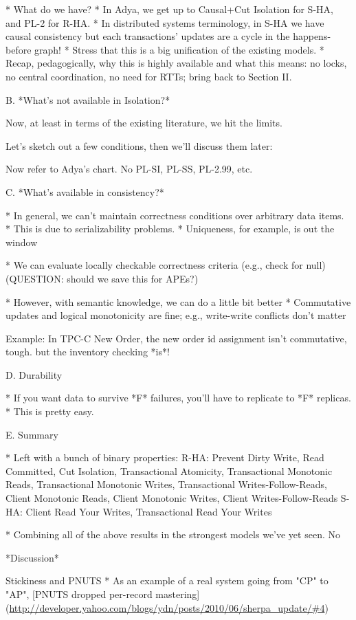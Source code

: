 * What do we have?
	* In Adya, we get up to Causal+Cut Isolation for S-HA, and PL-2 for R-HA.
	* In distributed systems terminology, in S-HA we have causal consistency but each transactions' updates are a cycle in the happens-before graph!
		* Stress that this is a big unification of the existing models.
	* Recap, pedagogically, why this is highly available and what this means: no locks, no central coordination, no need for RTTs; bring back to Section II.

B. *What's not available in Isolation?*

Now, at least in terms of the existing literature, we hit the limits.

Let's sketch out a few conditions, then we'll discuss them later:

Now refer to Adya's chart. No PL-SI, PL-SS, PL-2.99, etc.

C. *What's available in consistency?*

* In general, we can't maintain correctness conditions over arbitrary data items.
	* This is due to serializability problems.
	* Uniqueness, for example, is out the window

* We can evaluate locally checkable correctness criteria (e.g., check for null)
	(QUESTION: should we save this for APEs?)

* However, with semantic knowledge, we can do a little bit better
	* Commutative updates and logical monotonicity are fine; e.g., write-write conflicts don't matter
	
Example: In TPC-C New Order, the new order id assignment isn't commutative, tough. but the inventory checking *is*!

D. Durability

* If you want data to survive *F* failures, you'll have to replicate to *F* replicas.
	* This is pretty easy.

E. Summary

* Left with a bunch of binary properties: 
R-HA: Prevent Dirty Write, Read Committed, Cut Isolation, Transactional Atomicity, Transactional Monotonic Reads, Transactional Monotonic Writes, Transactional Writes-Follow-Reads, Client Monotonic Reads, Client Monotonic Writes, Client Writes-Follow-Reads
S-HA: Client Read Your Writes, Transactional Read Your Writes

* Combining all of the above results in the strongest models we've yet seen. No

*Discussion*

Stickiness and PNUTS
* As an example of a real system going from "CP" to "AP", [PNUTS dropped per-record mastering](\url{http://developer.yahoo.com/blogs/ydn/posts/2010/06/sherpa_update/#4})



